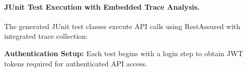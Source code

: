 \documentclass[conference]{IEEEtran}
\begin{document}

\paragraph{JUnit Test Execution with Embedded Trace Analysis.}
The generated JUnit test classes execute API calls using RestAssured with integrated trace collection:

\textbf{Authentication Setup:} Each test begins with a login step to obtain JWT tokens required for authenticated API access.
\end{document}
